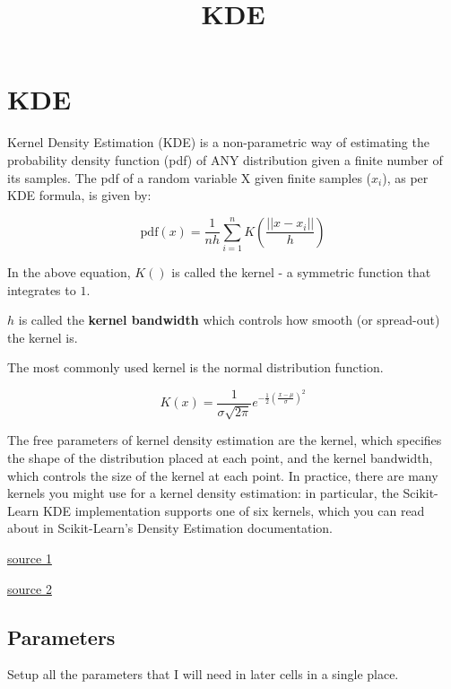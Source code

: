 \documentclass[11pt]{article}
\title{KDE}
\begin{document}
    
    \maketitle
    
    

    
    \hypertarget{kde}{%
\section{KDE}\label{kde}}

Kernel Density Estimation (KDE) is a non-parametric way of estimating
the probability density function (pdf) of ANY distribution given a
finite number of its samples. The pdf of a random variable X given
finite samples (\(x_i\)), as per KDE formula, is given by:

\[ \text{pdf}(x)=\frac{1}{nh}\sum_{i=1}^{n} K ( \frac{||x - x_i||}{h} )\]

In the above equation, \(K()\) is called the kernel - a symmetric
function that integrates to \(1\).

\(h\) is called the \textbf{kernel bandwidth} which controls how smooth
(or spread-out) the kernel is.

The most commonly used kernel is the normal distribution function.

\[ K(x)=\frac{1}{\sigma \sqrt{2 \pi}} e^{-\frac{1}{2}\left(\frac{x-\mu}{\sigma}\right)^{2}} \]

The free parameters of kernel density estimation are the kernel, which
specifies the shape of the distribution placed at each point, and the
kernel bandwidth, which controls the size of the kernel at each point.
In practice, there are many kernels you might use for a kernel density
estimation: in particular, the Scikit-Learn KDE implementation
supports one of six kernels, which you can read about in Scikit-Learn's
Density Estimation documentation.

\href{https://jakevdp.github.io/PythonDataScienceHandbook/05.13-kernel-density-estimation.html}{source
1}

\href{http://shogun-toolbox.org/notebook/latest/KernelDensity.html}{source
2}

    \hypertarget{parameters}{%
\subsection{Parameters}\label{parameters}}

Setup all the parameters that I will need in later cells in a single
place.
\end{document}
